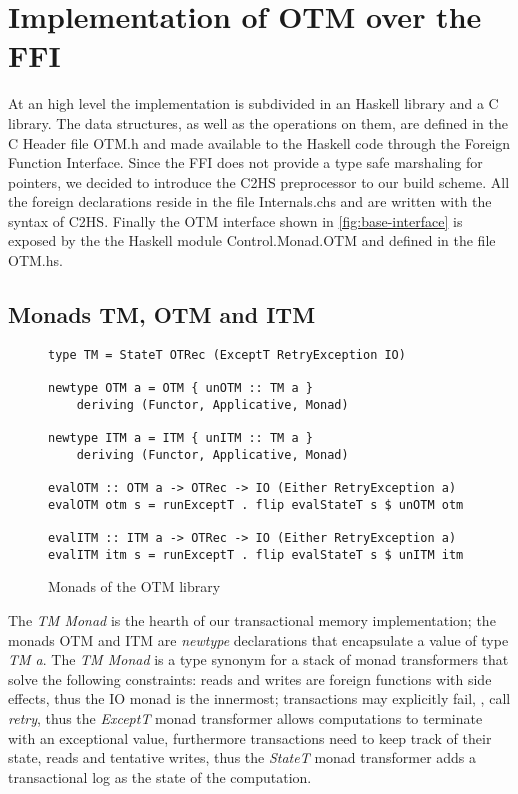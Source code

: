 
\chapter{Implementation of OTM over the FFI}

At an high level the implementation is subdivided in an Haskell library and a C library.
The data structures, as well as the operations on them, are defined in the C Header file OTM.h and made available to the Haskell code through the Foreign Function Interface.
Since the FFI does not provide a type safe marshaling for pointers, we decided to introduce the C2HS preprocessor to our build scheme.
All the foreign declarations reside in the file Internals.chs and are written with the syntax of C2HS.\cite{Chakravarty2000}
Finally the OTM interface shown in \cref{fig:base-interface} is exposed by the the Haskell module Control.Monad.OTM and defined in the file OTM.hs.

\section{Monads TM, OTM and ITM}
\begin{figure}
\begin{Verbatim}
type TM = StateT OTRec (ExceptT RetryException IO)

newtype OTM a = OTM { unOTM :: TM a }
    deriving (Functor, Applicative, Monad)

newtype ITM a = ITM { unITM :: TM a }
    deriving (Functor, Applicative, Monad)

evalOTM :: OTM a -> OTRec -> IO (Either RetryException a)
evalOTM otm s = runExceptT . flip evalStateT s $ unOTM otm

evalITM :: ITM a -> OTRec -> IO (Either RetryException a)
evalITM itm s = runExceptT . flip evalStateT s $ unITM itm
\end{Verbatim}
\caption{Monads of the OTM library}
\label{fig:monads}
\end{figure}
The \emph{TM Monad} is the hearth of our transactional memory implementation;
the monads OTM and ITM are \emph{newtype} declarations that encapsulate a value of type \emph{TM a}.
The \emph{TM Monad} is a type synonym for a stack of monad transformers that solve the following constraints:
reads and writes are foreign functions with side effects, thus the IO monad is the innermost;
transactions may explicitly fail, \ie, call \emph{retry}, thus the \emph{ExceptT} monad transformer allows computations to terminate with an exceptional value,
furthermore transactions need to keep track of their state, reads and tentative writes, thus the \emph{StateT} monad transformer adds a transactional log as the state of the computation.

